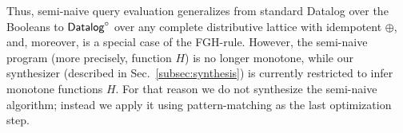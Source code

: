 \begin{ex}
  Thus, semi-naive query evaluation generalizes from standard Datalog
  over the Booleans to $\text{\sf Datalog}^\circ$ over any complete distributive lattice
  with idempotent $\oplus$, and, moreover, is a special case of the
  FGH-rule.  However, the semi-naive program (more precisely, function
  $H$) is no longer monotone, while our synthesizer (described in
  Sec.~\ref{subsec:synthesis}) is currently restricted to infer 
  monotone functions $H$.  For that reason we do not synthesize the
  semi-naive algorithm; instead we apply it using pattern-matching as
  the last optimization step.
\end{ex}




